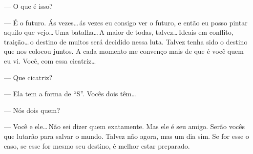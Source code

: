 --- O que é isso?

--- É o futuro. Ás vezes\ldots\,ás vezes eu consigo ver o futuro, e
então eu posso pintar aquilo que vejo\ldots\,Uma batalha\ldots\,A maior
de todas, talvez\ldots\,Ideais em conflito, traição\ldots\,o destino de
muitos será decidido nessa luta. Talvez tenha sido o destino que nos
colocou juntos. A cada momento me convenço mais de que é você quem eu
vi. Você, com essa cicatriz\ldots

--- Que cicatriz?

--- Ela tem a forma de “S”. Vocês dois têm\ldots

--- Nós dois quem?

--- Você e ele\ldots\,Não sei dizer quem exatamente. Mas ele é seu
amigo. Serão vocês que lutarão para salvar o mundo. Talvez não agora,
mas um dia sim. Se for esse o caso, se esse for mesmo seu destino, é
melhor estar preparado.
